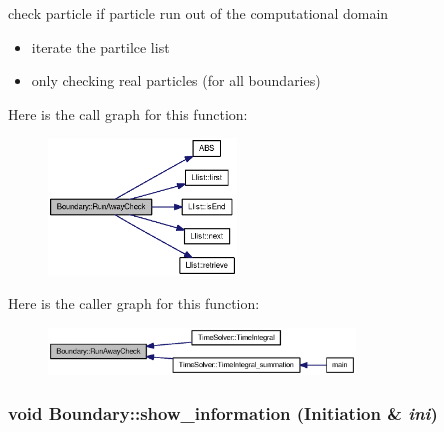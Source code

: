 check particle if particle run out of the computational domain 



\begin{itemize}
\item iterate the partilce list\end{itemize}


\begin{itemize}
\item only checking real particles (for all boundaries) \end{itemize}


Here is the call graph for this function:\nopagebreak
\begin{figure}[H]
\begin{center}
\leavevmode
\includegraphics[width=142pt]{classBoundary_ac37e18aaf60503a66173d9428ed9e54_cgraph}
\end{center}
\end{figure}


Here is the caller graph for this function:\nopagebreak
\begin{figure}[H]
\begin{center}
\leavevmode
\includegraphics[width=231pt]{classBoundary_ac37e18aaf60503a66173d9428ed9e54_icgraph}
\end{center}
\end{figure}
\hypertarget{classBoundary_116df4b717184d962f40bdc88de26763}{
\subsubsection[{show\_\-information}]{\setlength{\rightskip}{0pt plus 5cm}void Boundary::show\_\-information ({\bf Initiation} \& {\em ini})}}
\label{classBoundary_116df4b717184d962f40bdc88de26763}


